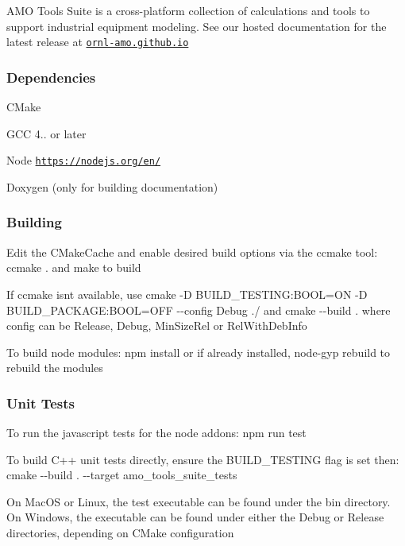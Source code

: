 A\+MO Tools Suite is a cross-\/platform collection of calculations and tools to support industrial equipment modeling. See our hosted documentation for the latest release at \href{https://ornl-amo.github.io/}{\tt ornl-\/amo.\+github.\+io}

\subsubsection*{Dependencies}


\begin{DoxyItemize}
\item C\+Make
\item G\+CC 4.. or later
\item Node \href{https://nodejs.org/en/}{\tt https\+://nodejs.\+org/en/}
\item Doxygen (only for building documentation)
\end{DoxyItemize}

\subsubsection*{Building}


\begin{DoxyItemize}
\item Edit the C\+Make\+Cache and enable desired build options via the ccmake tool\+: {\ttfamily ccmake .} and {\ttfamily make} to build
\item If ccmake isn\textquotesingle{}t available, use {\ttfamily cmake -\/D B\+U\+I\+L\+D\+\_\+\+T\+E\+S\+T\+I\+NG\+:B\+O\+OL=ON -\/D B\+U\+I\+L\+D\+\_\+\+P\+A\+C\+K\+A\+GE\+:B\+O\+OL=O\+FF -\/-\/config Debug ./} and {\ttfamily cmake -\/-\/build .} where config can be {\ttfamily Release}, {\ttfamily Debug}, {\ttfamily Min\+Size\+Rel} or {\ttfamily Rel\+With\+Deb\+Info}
\item To build node modules\+: {\ttfamily npm install} or if already installed, {\ttfamily node-\/gyp rebuild} to rebuild the modules
\end{DoxyItemize}

\subsubsection*{Unit Tests}


\begin{DoxyItemize}
\item To run the javascript tests for the node addons\+: {\ttfamily npm run test}
\item To build C++ unit tests directly, ensure the {\ttfamily B\+U\+I\+L\+D\+\_\+\+T\+E\+S\+T\+I\+NG} flag is set then\+: {\ttfamily cmake -\/-\/build . -\/-\/target amo\+\_\+tools\+\_\+suite\+\_\+tests}
\item On Mac\+OS or Linux, the test executable can be found under the {\ttfamily bin} directory. On Windows, the executable can be found under either the {\ttfamily Debug} or {\ttfamily Release} directories, depending on C\+Make configuration
\end{DoxyItemize}

